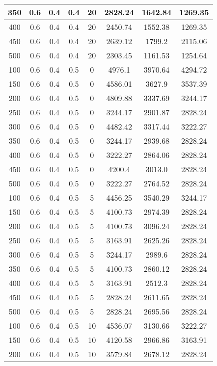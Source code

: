 \documentclass[a4paper, 12pt]{extreport}
\begin{document}
\begin{itemize}
\begin{longtable}{|c|c|c|c|c|c|c|c|}
			350 & 0.6 & 0.4 & 0.4 & 20 & 2828.24 & 1642.84 & 1269.35 \\\hline
			400 & 0.6 & 0.4 & 0.4 & 20 & 2450.74 & 1552.38 & 1269.35 \\\hline
			450 & 0.6 & 0.4 & 0.4 & 20 & 2639.12 & 1799.2 & 2115.06 \\\hline
			500 & 0.6 & 0.4 & 0.4 & 20 & 2303.45 & 1161.53 & 1254.64 \\\hline
			100 & 0.6 & 0.4 & 0.5 & 0 & 4976.1 & 3970.64 & 4294.72 \\\hline
			150 & 0.6 & 0.4 & 0.5 & 0 & 4586.01 & 3627.9 & 3537.39 \\\hline
			200 & 0.6 & 0.4 & 0.5 & 0 & 4809.88 & 3337.69 & 3244.17 \\\hline
			250 & 0.6 & 0.4 & 0.5 & 0 & 3244.17 & 2901.87 & 2828.24 \\\hline
			300 & 0.6 & 0.4 & 0.5 & 0 & 4482.42 & 3317.44 & 3222.27 \\\hline
			350 & 0.6 & 0.4 & 0.5 & 0 & 3244.17 & 2939.68 & 2828.24 \\\hline
			400 & 0.6 & 0.4 & 0.5 & 0 & 3222.27 & 2864.06 & 2828.24 \\\hline
			450 & 0.6 & 0.4 & 0.5 & 0 & 4200.4 & 3013.0 & 2828.24 \\\hline
			500 & 0.6 & 0.4 & 0.5 & 0 & 3222.27 & 2764.52 & 2828.24 \\\hline
			100 & 0.6 & 0.4 & 0.5 & 5 & 4456.25 & 3540.29 & 3244.17 \\\hline
			150 & 0.6 & 0.4 & 0.5 & 5 & 4100.73 & 2974.39 & 2828.24 \\\hline
			200 & 0.6 & 0.4 & 0.5 & 5 & 4100.73 & 3096.24 & 2828.24 \\\hline
			250 & 0.6 & 0.4 & 0.5 & 5 & 3163.91 & 2625.26 & 2828.24 \\\hline
			300 & 0.6 & 0.4 & 0.5 & 5 & 3244.17 & 2989.6 & 2828.24 \\\hline
			350 & 0.6 & 0.4 & 0.5 & 5 & 4100.73 & 2860.12 & 2828.24 \\\hline
			400 & 0.6 & 0.4 & 0.5 & 5 & 3163.91 & 2512.3 & 2828.24 \\\hline
			450 & 0.6 & 0.4 & 0.5 & 5 & 2828.24 & 2611.65 & 2828.24 \\\hline
			500 & 0.6 & 0.4 & 0.5 & 5 & 2828.24 & 2695.56 & 2828.24 \\\hline
			100 & 0.6 & 0.4 & 0.5 & 10 & 4536.07 & 3130.66 & 3222.27 \\\hline
			150 & 0.6 & 0.4 & 0.5 & 10 & 4120.58 & 2966.86 & 3163.91 \\\hline
			200 & 0.6 & 0.4 & 0.5 & 10 & 3579.84 & 2678.12 & 2828.24 \\\hline

\end{longtable}
\end{itemize}
\end{document}
